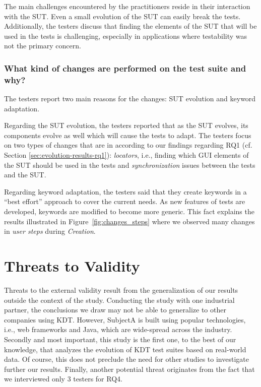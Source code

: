 The main challenges encountered by the practitioners reside in their interaction with the SUT. Even a small evolution of the SUT can easily break the tests. Additionally, the testers discuss that finding the elements of the SUT that will be used in the tests is challenging, especially in applications where testability was not the primary concern.

\subsubsection{What kind of changes are performed on the test suite and why?}

The testers report two main reasons for the changes: SUT evolution and keyword adaptation.

Regarding the SUT evolution, the testers reported that as the SUT evolves, its components evolve as well which will cause the tests to adapt. The testers focus on two types of changes that are in according to our findings regarding RQ1 (cf. Section \ref{sec:evolution-results-rq1}): \emph{locators}, i.e., finding which GUI elements of the SUT should be used in the tests and \emph{synchronization} issues between the tests and the SUT.

Regarding keyword adaptation, the testers said that they create keywords in a ``best effort'' approach to cover the current needs. As new features of tests are developed, keywords are modified to become more generic. This fact explains the results illustrated in Figure~\ref{fig:changes_steps} where we observed many changes in \emph{user steps} during \emph{Creation}.

\section{Threats to Validity}

Threats to the external validity result from the generalization of our results outside the context of the study. Conducting the study with one industrial partner, the conclusions we draw may not be able to generalize to other companies using KDT. However, SubjectA is built using popular technologies, i.e., web frameworks and Java, which are wide-spread across the industry. Secondly and most important, this study is the first one, to the best of our knowledge, that analyzes the evolution of KDT test suites based on real-world data. Of course, this does not preclude the need for other studies to investigate further our results. Finally, another potential threat originates from the fact that we interviewed only 3 testers for RQ4.

